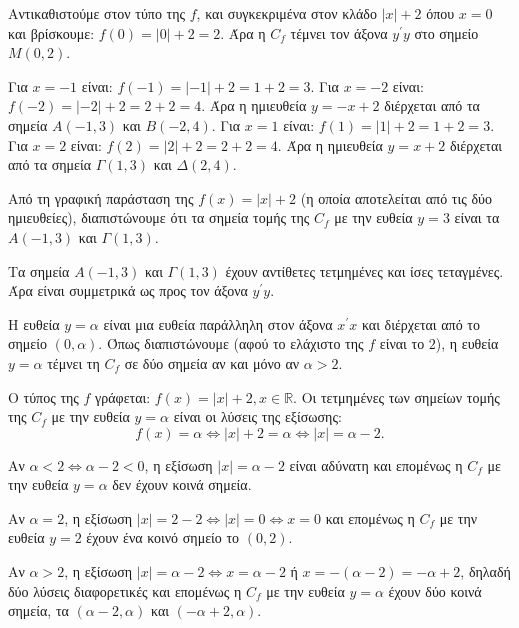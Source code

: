 
\begin{alist}
\item Αντικαθιστούμε στον τύπο της $f$, και συγκεκριμένα στον κλάδο $|x| + 2$ όπου $x = 0$ και βρίσκουμε: $f(0) = |0| + 2 = 2$.
Άρα η $C_f$ τέμνει τον άξονα $y^\prime y$ στο σημείο $M(0, 2)$.

\item
\begin{rlist}
\item Για $x = -1$ είναι: $f(-1) = |-1| + 2 = 1 + 2 = 3$.
Για $x = -2$ είναι: $f(-2) = |-2| + 2 = 2 + 2 = 4$.
Άρα η ημιευθεία $y = -x + 2$ διέρχεται από τα σημεία $A(-1, 3)$ και $B(-2, 4)$.
Για $x = 1$ είναι: $f(1) = |1| + 2 = 1 + 2 = 3$.
Για $x = 2$ είναι: $f(2) = |2| + 2 = 2 + 2 = 4$.
Άρα η ημιευθεία $y = x + 2$ διέρχεται από τα σημεία $\Gamma(1, 3)$ και $\Delta(2, 4)$.

Από τη γραφική παράσταση της $f(x)=|x|+2$ (η οποία αποτελείται από τις δύο ημιευθείες), διαπιστώνουμε ότι τα σημεία τομής της $C_f$ με την ευθεία $y = 3$ είναι τα $A(-1, 3)$ και $\Gamma(1, 3)$.

\item Τα σημεία $A(-1, 3)$ και $\Gamma(1, 3)$ έχουν αντίθετες τετμημένες και ίσες τεταγμένες. Άρα είναι συμμετρικά ως προς τον άξονα $y^\prime y$.
\end{rlist}

\item
\begin{rlist}
\item Η ευθεία $y = \alpha$ είναι μια ευθεία παράλληλη στον άξονα $x^\prime x$ και διέρχεται από το σημείο $(0, \alpha)$. Όπως διαπιστώνουμε (αφού το ελάχιστο της $f$ είναι το $2$), η ευθεία $y = \alpha$ τέμνει τη $C_f$ σε δύο σημεία αν και μόνο αν $\alpha > 2$.

\item Ο τύπος της $f$ γράφεται: $f(x) = |x| + 2, x \in \mathbb{R}$.
Οι τετμημένες των σημείων τομής της $C_f$ με την ευθεία $y = \alpha$ είναι οι λύσεις της εξίσωσης:
\[f(x) = \alpha \Leftrightarrow |x| + 2 = \alpha \Leftrightarrow |x| = \alpha - 2.\]

Αν $\alpha < 2 \Leftrightarrow \alpha - 2 < 0$, η εξίσωση $|x| = \alpha - 2$ είναι αδύνατη και επομένως η $C_f$ με την ευθεία $y = \alpha$ δεν έχουν κοινά σημεία.

Αν $\alpha = 2$, η εξίσωση $|x| = 2 - 2 \Leftrightarrow |x| = 0 \Leftrightarrow x = 0$ και επομένως η $C_f$ με την ευθεία $y = 2$ έχουν ένα κοινό σημείο το $(0, 2)$.

Αν $\alpha > 2$, η εξίσωση $|x| = \alpha - 2 \Leftrightarrow x = \alpha - 2$ ή $x = -(\alpha - 2) = -\alpha + 2$, δηλαδή δύο λύσεις διαφορετικές και επομένως η $C_f$ με την ευθεία $y = \alpha$ έχουν δύο κοινά σημεία, τα $(\alpha - 2, \alpha)$ και $(-\alpha + 2, \alpha)$.
\end{rlist}
\end{alist}

